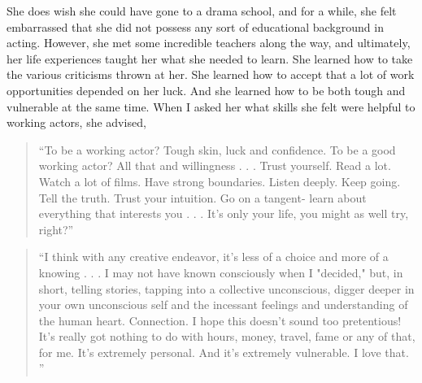 \begin{multicols}{2}
	She does wish she could have gone to a drama school, and for a while, she felt embarrassed that she did not possess any sort of educational background in acting. However, she met some incredible teachers along the way, and ultimately, her life experiences taught her what she needed to learn. She learned how to take the various criticisms thrown at her. She learned how to accept that a lot of work opportunities depended on her luck. And she learned how to be both tough and vulnerable at the same time. When I asked her what skills she felt were helpful to working actors, she advised,
	\begin{quote}
		“To be a working actor? Tough skin, luck and confidence. To be a good working actor? All that and willingness . . . Trust yourself. Read a lot. Watch a lot of films. Have strong boundaries. Listen deeply. Keep going. Tell the truth. Trust your intuition. Go on a tangent- learn about everything that interests you . . . It's only your life, you might as well try, right?”
	\end{quote}
	\begin{quote}
		“I think with any creative endeavor, it's less of a choice and more of a knowing . . . I may not have known consciously when I "decided," but, in short, telling stories, tapping into a collective unconscious, digger deeper in your own unconscious self and the incessant feelings and understanding of the human heart. Connection. I hope this doesn't sound too pretentious! It's really got nothing to do with hours, money, travel, fame or any of that, for me. It's extremely personal. And it's extremely vulnerable. I love that. ”
	\end{quote}


\end{multicols}

